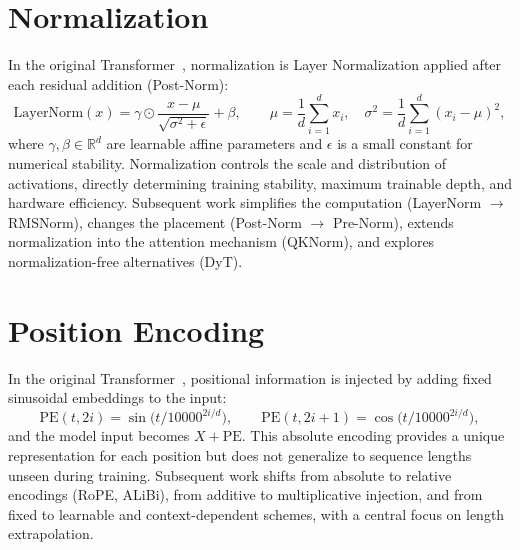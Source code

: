 \documentclass[11pt, a4paper]{article}
\begin{document}


\section{Normalization}
\label{sec:normalization}

In the original Transformer~\cite{vaswani2017attention}, normalization is Layer Normalization applied after each residual addition (Post-Norm):
\begin{equation}
\label{eq:ln_def}
\mathrm{LayerNorm}(x) = \gamma \odot \frac{x - \mu}{\sqrt{\sigma^2 + \epsilon}} + \beta, \qquad
\mu = \frac{1}{d}\sum_{i=1}^{d} x_i, \quad
\sigma^2 = \frac{1}{d}\sum_{i=1}^{d} (x_i - \mu)^2,
\end{equation}
where $\gamma, \beta \in \mathbb{R}^d$ are learnable affine parameters and $\epsilon$ is a small constant for numerical stability.
Normalization controls the scale and distribution of activations, directly determining training stability, maximum trainable depth, and hardware efficiency.
Subsequent work simplifies the computation (LayerNorm $\to$ RMSNorm), changes the placement (Post-Norm $\to$ Pre-Norm), extends normalization into the attention mechanism (QKNorm), and explores normalization-free alternatives (DyT).



\section{Position Encoding}
\label{sec:position-encoding}

In the original Transformer~\cite{vaswani2017attention}, positional information is injected by adding fixed sinusoidal embeddings to the input:
\begin{equation}
\label{eq:pe_def}
\mathrm{PE}(t, 2i) = \sin\!\bigl(t / 10000^{2i/d}\bigr), \qquad
\mathrm{PE}(t, 2i+1) = \cos\!\bigl(t / 10000^{2i/d}\bigr),
\end{equation}
and the model input becomes $X + \mathrm{PE}$.
This absolute encoding provides a unique representation for each position but does not generalize to sequence lengths unseen during training.
Subsequent work shifts from absolute to relative encodings (RoPE, ALiBi), from additive to multiplicative injection, and from fixed to learnable and context-dependent schemes, with a central focus on length extrapolation.
\end{document}

